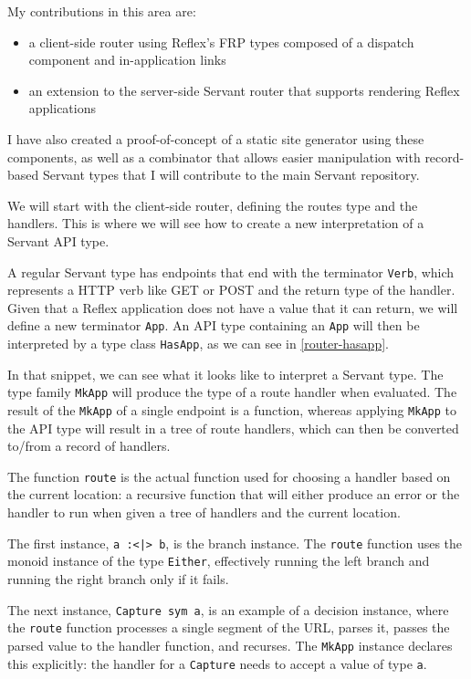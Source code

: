 \documentclass[english,odsaz]{fitthesis}
\begin{document}
My contributions in this area are:
\begin{itemize}
\item a client-side router using Reflex's FRP types composed of a dispatch component
and in-application links
\item an extension to the server-side Servant router that supports rendering Reflex
applications
\end{itemize}

I have also created a proof-of-concept of a static site generator using these
components, as well as a combinator that allows easier manipulation with
record-based Servant types that I will contribute to the main Servant
repository.

We will start with the client-side router, defining the routes type and the
handlers. This is where we will see how to create a new interpretation of a
Servant API type.

A regular Servant type has endpoints that end with the terminator \texttt{Verb}, which
represents a HTTP verb like GET or POST and the return type of the
handler. Given that a Reflex application does not have a value that it can
return, we will define a new terminator \texttt{App}. An API type containing an \texttt{App} will
then be interpreted by a type class \texttt{HasApp}, as we can see in \ref{router-hasapp}.

In that snippet, we can see what it looks like to interpret a Servant type. The
type family \texttt{MkApp} will produce the type of a route handler when evaluated. The
result of the \texttt{MkApp} of a single endpoint is a function, whereas applying \texttt{MkApp}
to the API type will result in a tree of route handlers, which can then be
converted to/from a record of handlers.

The function \texttt{route} is the actual function used for choosing a handler based on
the current location: a recursive function that will either produce an error or
the handler to run when given a tree of handlers and the current location.

The first instance, \texttt{a :<|> b}, is the branch instance. The \texttt{route} function uses
the monoid instance of the type \texttt{Either}, effectively running the left branch and
running the right branch only if it fails.

The next instance, \texttt{Capture sym a}, is an example of a decision instance, where
the \texttt{route} function processes a single segment of the URL, parses it, passes the
parsed value to the handler function, and recurses. The \texttt{MkApp} instance declares
this explicitly: the handler for a \texttt{Capture} needs to accept a value of type \texttt{a}.
\end{document}

